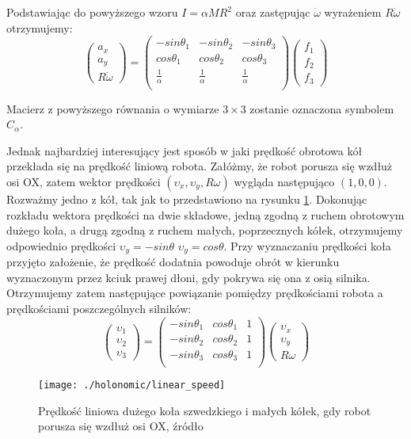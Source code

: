 Podstawiając do powyższego wzoru $I=\alpha MR^2$ oraz zastępując $\dot{\omega}$ wyrażeniem $R\dot{\omega}$ otrzymujemy:
\begin{equation}
 \begin{pmatrix}
  a_x\\
  a_y\\
  R\dot{\omega}
 \end{pmatrix}
  =
\begin{pmatrix}
  -sin\theta_1 & -sin\theta_2 & -sin\theta_3 \\
  cos\theta_1 & cos\theta_2 & cos\theta_3 \\
  \frac{1}{\alpha} & \frac{1}{\alpha} & \frac{1}{\alpha}\\
 \end{pmatrix} 
 \begin{pmatrix}
  f_1\\
  f_2\\
  f_3
 \end{pmatrix}
\end{equation}

Macierz z powyższego równania o wymiarze $3\times3$ zostanie oznaczona symbolem~$C_{\alpha}$.

Jednak najbardziej interesujący jest sposób w jaki prędkość obrotowa kół przekłada się na prędkość liniową robota.
Załóżmy, że robot porusza się wzdłuż osi OX, zatem wektor prędkości $(\upsilon_{x}, \upsilon_{y}, R\omega)$ wygląda następująco $(1,0,0)$.
Rozważmy jedno z kół, tak jak to przedstawiono na rysunku \ref{fig:linear_speed}. Dokonując rozkładu wektora prędkości na dwie składowe, jedną zgodną z ruchem
obrotowym dużego koła, a drugą zgodną z ruchem małych, poprzecznych kółek, otrzymujemy odpowiednio prędkości $\upsilon_{y}=-sin\theta$ $\upsilon_{y}=cos\theta$.
Przy wyznaczaniu prędkości koła przyjęto założenie, że prędkość dodatnia powoduje obrót w kierunku wyznaczonym przez kciuk prawej dłoni, gdy pokrywa się ona z osią 
silnika.
Otrzymujemy zatem następujące powiązanie pomiędzy prędkościami robota a prędkościami poszczególnych silników:
 \begin{equation}
 \begin{pmatrix}
  \upsilon_1\\
  \upsilon_2\\
  \upsilon_3
 \end{pmatrix}
  =
\begin{pmatrix}
  -sin\theta_1 & cos\theta_1 & 1 \\
  -sin\theta_2 & cos\theta_2 & 1 \\
  -sin\theta_3 & cos\theta_3 & 1 \\
 \end{pmatrix} 
 \begin{pmatrix}
  \upsilon_x\\
  \upsilon_y\\
  R\omega
 \end{pmatrix}
\end{equation}
\begin{figure}[h]
\centering
\texttt{[image: ./holonomic/linear\_speed]}
\caption{ Prędkość liniowa dużego koła szwedzkiego i małych kółek, gdy robot porusza się wzdłuż osi OX, źródło\cite{omni_base_1} }\label{fig:linear_speed}
\end{figure}

